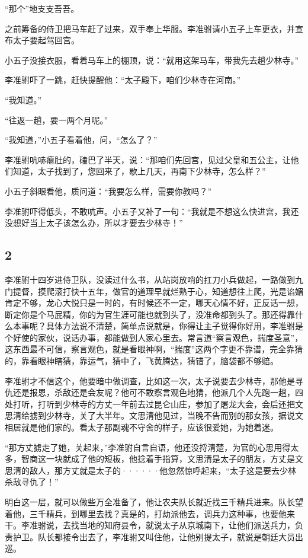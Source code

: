 “那个”地支支吾吾。

之前筹备的侍卫把马车赶了过来，双手奉上华服。李准驸请小五子上车更衣，并宣布太子要起驾回宫。

小五子没接衣服，看着马车上的棚顶，说：“就用这架马车，带我先去趟少林寺。”

李准驸吓了一跳，赶快提醒他：“太子殿下，咱们少林寺在河南。”

“我知道。”

“往返一趟，要一两个月呢。”

“我知道，”小五子看着他，问，“怎么了？”

李准驸吭哧瘪肚的，磕巴了半天，说：“那咱们先回宫，见过父皇和五公主，让他们知道，太子找到了，您回来了，歇上几天，再南下少林寺，怎么样？”

小五子斜眼看他，质问道：“我要怎么样，需要你教吗？”

李准驸吓得低头，不敢吭声。小五子又补了一句：“我就是不想这么快进宫，我还没想好当上太子该怎么办，所以才要去少林寺！”
\newline

{\centering\subsection{2}}

李准驸十四岁进侍卫队，没读过什么书，从站岗放哨的扛刀小兵做起，一路做到九门提督，摸爬滚打快十五年，做官的道理早就烂熟于心，知道想往上爬，光是谄媚肯定不够，龙心大悦只是一时的，有时候还不一定，哪天心情不好，正反话一想，断定你是个马屁精，你的为官生涯可能也就到头了，没准命都到头了。那还得靠什么本事呢？具体方法说不清楚，简单点说就是，你得让主子觉得你好用，李准驸是个好使的家伙，说话办事，都能做到人家心里去。常言道“察言观色，揣度圣意”，这东西最不可信，察言观色，就是看眼神啊，“揣度”这两个字更不靠谱，完全靠猜的，靠看眼神瞎猜，靠运气，猜中了，飞黄腾达，猜错了，脑袋都不够赔。

李准驸才不信这个，他要暗中做调查，比如这一次，太子说要去少林寺，那他是寻仇还是报恩，杀敌还是会友呢？他可不敢察言观色地猜，他派几个人先跑一趟，四处打听，打听到少林寺的方丈一年前去过昆仑山庄，参加了屠龙大会，会后还把文思清给掳到少林寺，关了大半年。文思清他见过，当晚不告而别的那女孩，据说文相居就是他们家的。看太子那副魂不守舍的样子，应该很爱她，为她着迷。

“那方丈掳走了她，关起来，”李准驸自言自语，他还没捋清楚，为官的心思用得太多，智商这一块就成了他的短板，他捻着手指算，文思清是太子的朋友，方丈是文思清的敌人，那方丈就是太子的······他忽然惊呼起来，“太子这是要去少林杀敌寻仇了！”

明白这一层，就可以做些万全准备了，他让农夫队长就近找三千精兵进来。队长望着他，三千精兵，到哪里去找？真是的，打劫派他去，调兵力这种事，也要他来干。李准驸说，去找当地的知府县令，就说太子从京城南下，让他们派送兵力，负责护卫。队长都接令出去了，李准驸又叫住他，让他别提太子，就说是朝廷大员出巡。

